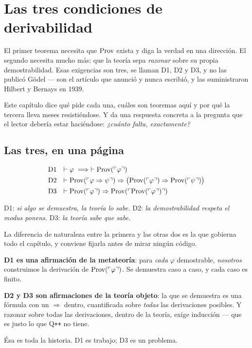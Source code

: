 \chapter{Las tres condiciones de derivabilidad}
\label{cap:d123}

El primer teorema necesita que $\operatorname{Prov}$ exista y diga la verdad en una dirección. El segundo
necesita mucho más: que la teoría sepa \emph{razonar} sobre su propia demostrabilidad. Esas
exigencias son tres, se llaman D1, D2 y D3, y no las publicó Gödel — son el artículo que anunció y
nunca escribió, y las suministraron Hilbert y Bernays en 1939.

Este capítulo dice qué pide cada una, cuáles son teoremas aquí y por qué la tercera lleva meses
resistiéndose. Y da una respuesta concreta a la pregunta que el lector debería estar haciéndose:
\emph{¿cuánto falta, exactamente?}

\section{Las tres, en una página}

\begin{matematica}
\[
\begin{array}{ll}
\text{D1} & \vdash \varphi \;\Longrightarrow\; \vdash \operatorname{Prov}(\ulcorner \varphi \urcorner) \\[4pt]
\text{D2} & \vdash \operatorname{Prov}(\ulcorner \varphi \Rightarrow \psi \urcorner) \Rightarrow
             \bigl(\operatorname{Prov}(\ulcorner \varphi \urcorner) \Rightarrow \operatorname{Prov}(\ulcorner \psi \urcorner)\bigr) \\[4pt]
\text{D3} & \vdash \operatorname{Prov}(\ulcorner \varphi \urcorner) \Rightarrow \operatorname{Prov}(\ulcorner \operatorname{Prov}(\ulcorner \varphi \urcorner) \urcorner)
\end{array}
\]

\noindent D1: \emph{si algo se demuestra, la teoría lo sabe.} \quad
D2: \emph{la demostrabilidad respeta el modus ponens.} \quad
D3: \emph{la teoría sabe que sabe.}
\end{matematica}

La diferencia de naturaleza entre la primera y las otras dos es la que gobierna todo el capítulo, y
conviene fijarla antes de mirar ningún código.

\begin{leccion}
\textbf{D1 es una afirmación de la metateoría}: para \emph{cada} $\varphi$ demostrable,
\emph{nosotros} construimos la derivación de $\operatorname{Prov}(\ulcorner \varphi \urcorner)$. Se demuestra caso a caso, y
cada caso es finito.

\textbf{D2 y D3 son afirmaciones de la teoría objeto}: la que se demuestra es una fórmula con un
$\Rightarrow$ dentro, cuantificada sobre \emph{todas} las derivaciones posibles. Y razonar sobre
todas las derivaciones, dentro de la teoría, exige inducción — que es justo lo que
Q\texttt{++} no tiene.

Ésa es toda la historia. D1 es trabajo; D3 es un problema.
\end{leccion}

